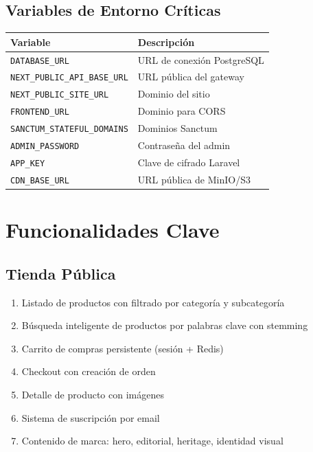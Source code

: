 \documentclass[11pt,a4paper]{article}
\begin{document}
\subsection{Variables de Entorno Críticas}

\begin{tabularx}{\textwidth}{|l|X|}
\hline
\textbf{Variable} & \textbf{Descripción} \\
\hline
\texttt{DATABASE\_URL} & URL de conexión PostgreSQL \\
\texttt{NEXT\_PUBLIC\_API\_BASE\_URL} & URL pública del gateway \\
\texttt{NEXT\_PUBLIC\_SITE\_URL} & Dominio del sitio \\
\texttt{FRONTEND\_URL} & Dominio para CORS \\
\texttt{SANCTUM\_STATEFUL\_DOMAINS} & Dominios Sanctum \\
\texttt{ADMIN\_PASSWORD} & Contraseña del admin \\
\texttt{APP\_KEY} & Clave de cifrado Laravel \\
\texttt{CDN\_BASE\_URL} & URL pública de MinIO/S3 \\
\hline
\end{tabularx}

\section{Funcionalidades Clave}

\subsection{Tienda Pública}
\begin{enumerate}
    \item Listado de productos con filtrado por categoría y subcategoría
    \item Búsqueda inteligente de productos por palabras clave con stemming
    \item Carrito de compras persistente (sesión + Redis)
    \item Checkout con creación de orden
    \item Detalle de producto con imágenes
    \item Sistema de suscripción por email
    \item Contenido de marca: hero, editorial, heritage, identidad visual
\end{enumerate}
\end{document}
